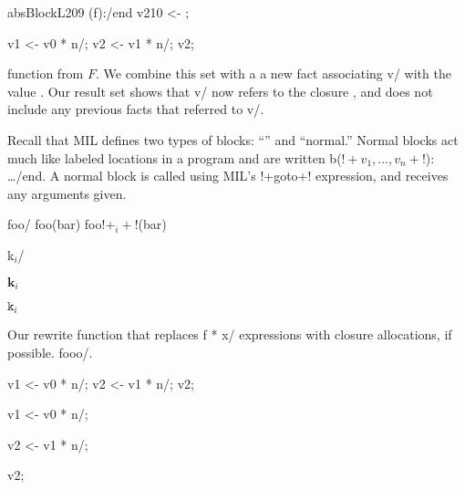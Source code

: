 \documentclass{article}
\begin{document}
  \begin{AVerb}
    \block absBlockL209 (f):/end
      \vbinds v210 <- \mkclo[absBodyL201:];
      \mkclo[absBodyL202:f]
  \end{AVerb}

\begin{AVerb}
  \vbinds v1 <- \app v0 * n/;
  \vbinds v2 <- \app v1 * n/;
  \return v2; 
\end{AVerb}

function from $F$.  We combine this set with a a new fact associating
\var v/ with the  value \clo[l:v_1, \dots, v_n]. Our result
set shows that \var v/ now refers to the closure \clo[l:v_1, \dots,
  v_n], and does not include any previous facts that referred to \var
v/.

Recall \clo[k0:] 
that MIL defines two types of blocks: ``\cc'' and ``normal.''
Normal blocks act much like labeled locations in a program and are
written \block b($!+v_1, \dots, v_n+!$): \dots/end.  A normal block is
called using MIL's !+goto+! expression, and receives any arguments
given. 

\lab foo/ \goto foo(bar)
\goto foo$!+_i+!$(bar)

\lab k$_i$/ 

\ensuremath{\mathbf k_i}

\ensuremath{\mathtt k_i}

\begin{myfig}
  \caption{Our rewrite function that replaces \app f * x/ expressions
    with closure allocations, if possible. \lab fooo/.}
  \label{uncurry_fig_rewrite}
\end{myfig}

\begin{AVerb}
  \vbinds v1 <- \app v0 * n/;
  \vbinds v2 <- \app v1 * n/;
  \return v2; 
\end{AVerb}

  \binds v1 <- \app v0 * n/;

  \binds v2 <- \app v1 * n/;

  \return v2; 
\listoffigures
\end{document}
